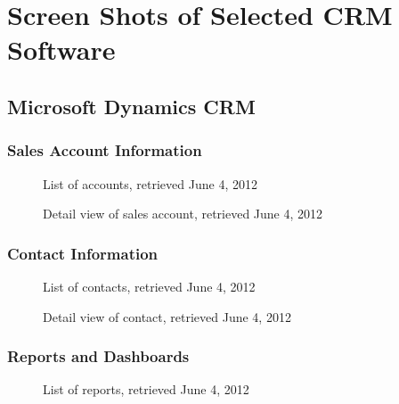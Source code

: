\chapter{Screen Shots of Selected CRM Software}
\label{app:screenshots}

\section{Microsoft Dynamics CRM}
\label{appsec:microsoft}
\subsection{Sales Account Information}

\begin{figure}[htbp]
	\centering
	\caption[Microsoft Dynamics CRM: List of accounts]{List of accounts, retrieved June 4, 2012}
\end{figure}

\begin{figure}[htbp]
	\centering
	\caption[Microsoft Dynamics CRM: Detail view of sales account]{Detail view of sales account, retrieved June 4, 2012}
\end{figure}

\FloatBarrier
\subsection{Contact Information}
\begin{figure}[htbp]
	\centering
	\caption[Microsoft Dynamics CRM: List of contacts]{List of contacts, retrieved June 4, 2012}
\end{figure}

\begin{figure}[htbp]
	\centering
	\caption[Microsoft Dynamics CRM: Detail view of contact]{Detail view of contact, retrieved June 4, 2012}
\end{figure}

\FloatBarrier
\subsection{Reports and Dashboards}

\begin{figure}[htbp]
	\centering
	\caption[Microsoft Dynamics CRM: List of reports]{List of reports, retrieved June 4, 2012}
\end{figure}

